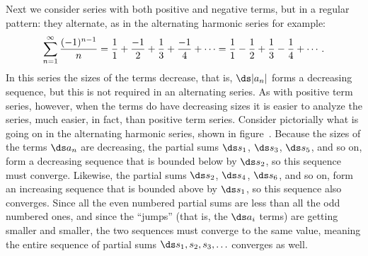 \nobreak
Next we consider series with both positive and negative terms, but in
a regular pattern: they alternate, as in the {\dfont alternating
  harmonic series%
%
\/} for example:
$$
  \sum_{n=1}^\infty {(-1)^{n-1}\over n}=
  {1\over1}+{-1\over2}+{1\over3}+{-1\over4}+\cdots=
  {1\over1}-{1\over2}+{1\over3}-{1\over4}+\cdots.
$$
In this series the sizes of the terms decrease, that is, 
$\ds |a_n|$ forms a decreasing sequence, but this is not required in an
alternating series. As with positive term series, however, when the
terms do have decreasing sizes it is easier to analyze the series,
much easier, in fact, than positive term series. Consider pictorially
what is going on in the alternating harmonic series, shown in
figure~. Because the sizes of
the terms $\ds a_n$ are decreasing, the partial sums $\ds s_1$, $\ds s_3$, $\ds s_5$,
and so on, form a decreasing sequence that is bounded below by
$\ds s_2$, so this sequence must converge.
Likewise, the partial sums $\ds s_2$, $\ds s_4$, $\ds s_6$,
and so on, form an increasing sequence that is bounded above by
$\ds s_1$, so this sequence also converges. Since all the even numbered
partial sums are less than all the odd numbered ones, and since the
``jumps'' (that is, the $\ds a_i$ terms) are getting smaller and smaller,
the two sequences must converge to the same value, meaning the entire
sequence of partial sums $\ds s_1,s_2,s_3,\ldots$ converges as well.


